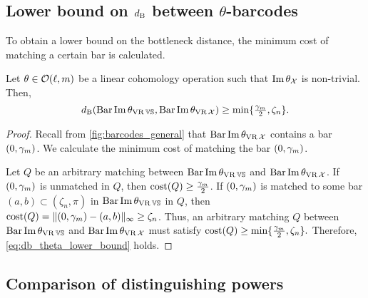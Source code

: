 
\subsection{Lower bound on $d_{\mathrm{B}}$ between $\theta$-barcodes}
\label{subsub:db_theta_lower_bound}

To obtain a lower bound on the bottleneck distance, the minimum cost of matching a certain bar is calculated.

\medskip\proposition
Let $\theta \in \mathcal{O}(\ell, m)$ be a linear cohomology operation such that $\operatorname{Im} \theta_{\mathcal{X}}$ is non-trivial.
Then,
\begin{equation}\label{eq:db_theta_lower_bound}
	\db(\thetabarc{\VS}, \thetabarc{\cX})
	\geq \min\{\tfrac{\gamma_\degp }{2}, \zeta_n\}. %
\end{equation}

\begin{proof}
	Recall from \cref{fig:barcodes_general} that $\operatorname{Bar}\operatorname{Im} \theta_{\operatorname{VR} \mathcal{X}}$ contains a bar $(0,\gamma_m)$.
	We calculate the minimum cost of matching the bar $(0,\gamma_m)$.

	Let $Q$ be an arbitrary matching between $\operatorname{Bar}\operatorname{Im} \theta_{\operatorname{VR} \mathbb{V}\mathbb{S}}$ and $\operatorname{Bar}\operatorname{Im} \theta_{\operatorname{VR} \mathcal{X}}$.
	If $(0,\gamma_m )$ is unmatched in $Q$, then $\mathrm{cost}(Q) \geq \tfrac{\gamma_m }{2}$.
	If $(0,\gamma_m )$ is matched to some bar $(a,b) \subset (\zeta_n, \pi)$ in $\operatorname{Bar}\operatorname{Im} \theta_{\operatorname{VR} \mathbb{V}\mathbb{S}}$ in $Q$, then
	$\mathrm{cost}(Q) =  \|(0,\gamma_m ) - (a,b)\|_\infty \geq \zeta_n$.
	Thus, an arbitrary matching $Q$ between $\operatorname{Bar}\operatorname{Im} \theta_{\operatorname{VR} \mathbb{V}\mathbb{S}}$ and $\operatorname{Bar}\operatorname{Im} \theta_{\operatorname{VR} \mathcal{X}}$ must satisfy $\mathrm{cost}(Q) \geq \min\{\tfrac{\gamma_m }{2}, \zeta_n\}.$
	Therefore, \cref{eq:db_theta_lower_bound} holds.
\end{proof}

\subsection{Comparison of distinguishing powers}
\label{subsub:main_theorem}

\subsubsection{}
\label{subsub:comparison_lemma}

